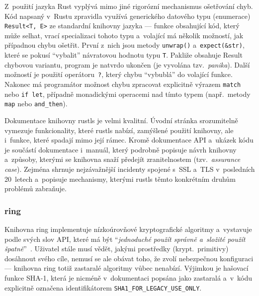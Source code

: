 Z~použití jazyka Rust vyplývá mimo jiné rigorózní mechanismus ošetřování chyb. Kód napsaný v~Rustu zpravidla využívá generického datového typu (enumerace) \texttt{Result<T,~E>} ze standardní knihovny jazyka --- funkce obsahující kód, který může selhat, vrací specializaci tohoto typu a~volající má několik možností, jak případnou chybu ošetřit. První z~nich jsou metody \texttt{unwrap()} a~\texttt{expect(\&str)}, které se pokusí ``vybalit'' návratovou hodnotu typu \texttt{T}. Pakliže obsahuje Result chybovou variantu, program je natvrdo ukončen (je vyvolána tzv.~\textit{panika}). Další možností je použití operátoru~\texttt{?}, který chybu ``vybublá'' do volající funkce. Nakonec má programátor možnost chybu zpracovat explicitně výrazem \texttt{match} nebo \texttt{if~let}, případně monadickými operacemi nad tímto typem (např.\ metody \texttt{map} nebo \texttt{and\_then}).

Dokumentace knihovny rustls je velmi kvalitní. Úvodní stránka srozumitelně vymezuje funkcionality, které rustls nabízí, zamýšlené použití knihovny, ale i~funkce, které spadají mimo její rámec. Kromě dokumentace API a~ukázek kódu je součástí dokumentace i~manuál, který podrobně popisuje návrh knihovny a~způsoby, kterými se knihovna snaží předejít zranitelnostem (tzv.~\textit{assurance case}). Zejména shrnuje nejzávažnější incidenty spojené s~SSL a~TLS v~posledních 20~letech a~popisuje mechanismy, kterými rustls těmto konkrétním druhům problémů zabraňuje.~\cite{rustls-man}

\subsubsection*{ring}

Knihovna ring implementuje nízkoúrovňové kryptografické algoritmy a~vystavuje podle svých slov API, které má být ``\textit{jednoduché použít správně a~složité použít špatně}''~\cite{ringgithub}. Uživatel stále musí vědět, jakými prostředky (krypt.\ primitivy) dosáhnout svého cíle, nemusí se ale obávat toho, že zvolí nebezpečnou konfiguraci --- knihovna ring totiž zastaralé algoritmy vůbec nenabízí. Výjimkou je hašovací funkce SHA-1, která je nicméně v~dokumentaci popsána jako zastaralá a~v~kódu explicitně označena identifikátorem \texttt{SHA1\_FOR\_LEGACY\_USE\_ONLY}.

